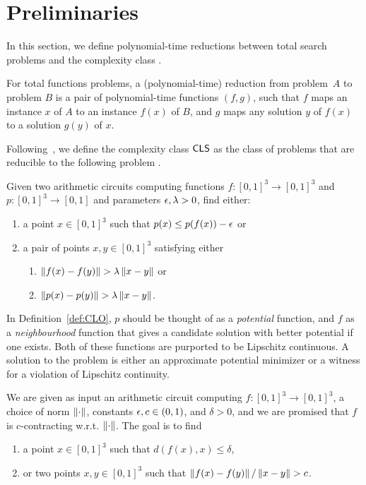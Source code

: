 \chapter{Preliminaries}

In this section, we define polynomial-time reductions between total search problems
and the complexity class \CLS.
%
\begin{definition}
For total functions problems, a (polynomial-time) reduction from problem~$A$ to
problem $B$ is a pair of polynomial-time functions $(f,g)$, such that $f$ 
maps an instance $x$ of $A$ to an instance $f(x)$ of $B$, and $g$ maps
any solution $y$ of $f(x)$ to a solution $g(y)$ of $x$.
\end{definition}
%
Following~\cite{daskalakis2011continuous}, we define the complexity class $\mathsf{CLS}$
as the class of problems that are reducible to the following problem \CLO.

\begin{definition}
\label{def:CLO}
Given two arithmetic circuits computing functions $f : [0,1]^3\to [0,1]^3$ and $p :
[0,1]^3 \to [0,1]$ and parameters $\epsilon, \lambda > 0$, find either:
\begin{enumerate}[leftmargin=*,label=(C\arabic*)]
\item a point $x\in [0,1]^3$ such that $p(x) \leq p(f(x)) - \epsilon$ or \label{c_fixpoint}
\item a pair of points $x,y\in [0,1]^3$ satisfying either \label{c_violation}
  \begin{enumerate}[label=(C\arabic{enumi}\alph*)] 
  \item $\left\| f(x) - f(y) \right\| > \lambda \left\| x-y \right\|$ or \label{c_bad_f}
  \item $\left\| p(x) - p(y) \right\| > \lambda \left\| x-y \right\|$. \label{c_bad_p}
  \end{enumerate}
\end{enumerate}
\end{definition}

In Definition~\ref{def:CLO}, $p$ should be thought of as a \emph{potential}
function, and $f$ as a \emph{neighbourhood} function that gives a candidate
solution with better potential if one exists. Both of these functions are 
purported to be Lipschitz continuous. A solution to the problem is either an approximate
potential minimizer or a witness for a violation of Lipschitz continuity.

\begin{definition} \label{def:contractionmap}
We are given as input an arithmetic circuit computing $f: [0,1]^3\to [0,1]^3$,
a choice of norm $\left\| \cdot \right\|$, constants \mbox{$\epsilon,c \in (0,1)$},
and $\delta > 0$, and we are promised that $f$ is $c$-contracting w.r.t. $\left\| \cdot \right\|$.
The goal is to find
\begin{enumerate}[label=(CM\arabic*)]
\item a point $x\in [0,1]^3$ such that $d(f(x),x) \leq \delta$, 
\item or two points $x,y\in [0,1]^3$ such that $\left\| f(x) - f(y) \right\|/\left\| x-y \right\| > c$. 
\end{enumerate}
\end{definition}

